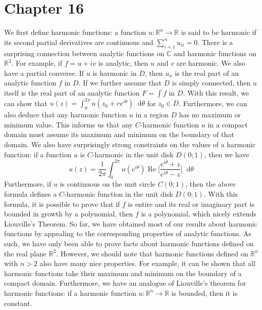 \documentclass[12pt]{article}
\newcommand{\cc}{{\mathbb C}}
\newcommand{\rr}{{\mathbb R}}
\newcommand*\diff{\mathop{}\!\mathrm{d}}
\DeclareMathOperator{\re}{Re}
\begin{document}
\section*{Chapter 16}
We first define harmonic functions: a function $u: \rr^n \rightarrow \rr$ is said to be harmonic if its second partial derivatives are continuous and $\sum_{i=1}^n u_{ii} = 0$. There is a surprising connection between analytic functions on $\cc$ and harmonic functions on $\rr^2$. For example, if $f = u + iv$ is analytic, then $u$ and $v$ are harmonic. We also have a partial converse. If $u$ is harmonic in $D$, then $u_x$ is the real part of an analytic function $f$ in $D$. If we further assume that $D$ is simply connected, then $u$ itself is the real part of an analytic function $F = \int f$ in $D$. With this result, we can show that $u(z) = \int_0^{2\pi} u(z_0 + re^{i\theta}) \diff \theta$ for $z_0 \in D$. Furthermore, we can also deduce that any harmonic function $u$ in a region $D$ has no maximum or minimum value. This informs us that any $C$-harmonic function $u$ in a compact domain must assume its maximum and minimum on the boundary of that domain. We also have surprisingly strong constraints on the values of a harmonic function: if a function $u$ is $C$-harmonic in the unit disk $D(0;1)$, then we have
\[
u(z) = \frac{1}{2\pi} \int_0^{2\pi} u(e^{i\theta}) \re\bigg[\frac{e^{i\theta}+z}{e^{i\theta}-z}\bigg] \diff \theta
\] Furthermore, if $u$ is continuous on the unit circle $C(0;1)$, then the above formula defines a $C$-harmonic function in the unit disk $D(0;1)$. With this formula, it is possible to prove that if $f$ is entire and its real or imaginary part is bounded in growth by a polynomial, then $f$ is a polynomial, which nicely extends Liouville's Theorem. So far, we have obtained most of our results about harmonic functions by appealing to the corresponding properties of analytic functions. As such, we have only been able to prove facts about harmonic functions defined on the real plane $\rr^2$. However, we should note that harmonic functions defined on $\rr^n$ with $n > 2$ also have many nice properties. For example, it can be shown that all harmonic functions take their maximum and minimum on the boundary of a compact domain. Furthermore, we have an analogue of Liouville's theorem for harmonic functions: if a harmonic function $u: \rr^n \rightarrow \rr$ is bounded, then it is constant.
\end{document}
